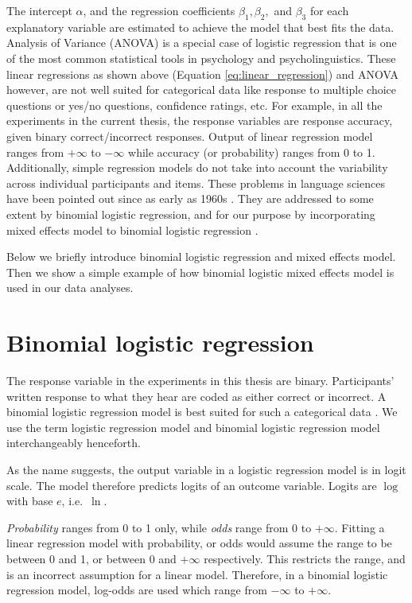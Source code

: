 \documentclass[a4paper, nobind]{templates/ociamthesis}
\begin{document}
The intercept \(\alpha\), and the regression coefficients \(\beta_1, \beta_2,\) and \(\beta_3\) for each explanatory variable are estimated to achieve the model that best fits the data.
Analysis of Variance (ANOVA) is a special case of logistic regression \autocite{Chatterjee2012,Vasishth2022} that is one of the most common statistical tools in psychology and psycholinguistics.
These linear regressions as shown above (Equation \ref{eq:linear_regression}) and ANOVA however, are not well suited for categorical data like response to multiple choice questions or yes/no questions, confidence ratings, etc.
For example, in all the experiments in the current thesis, the response variables are response accuracy, given binary correct/incorrect responses.
Output of linear regression model ranges from \(+\infty\) to \(-\infty\) while accuracy (or probability) ranges from 0 to 1.
Additionally, simple regression models do not take into account the variability across individual participants and items.
These problems in language sciences have been pointed out since as early as 1960s \autocite{Coleman1964,Clark1973}.
They are addressed to some extent by binomial logistic regression, and for our purpose by incorporating mixed effects model to binomial logistic regression \autocite{Baayen2008}.

Below we briefly introduce binomial logistic regression and mixed effects model.
Then we show a simple example of how binomial logistic mixed effects model is used in our data analyses.

\hypertarget{binomial-logistic-regression}{%
\section{Binomial logistic regression}\label{binomial-logistic-regression}}

The response variable in the experiments in this thesis are binary.
Participants' written response to what they hear are coded as either correct or incorrect.
A binomial logistic regression model is best suited for such a categorical data \autocite{Jaeger2008}.
We use the term logistic regression model and binomial logistic regression model interchangeably henceforth.

As the name suggests, the output variable in a logistic regression model is in logit scale.
The model therefore predicts logits of an outcome variable.
Logits are \(\log\) with base \(e\), i.e.~\(\ln\).

\emph{Probability} ranges from 0 to 1 only, while \emph{odds} range from 0 to \(+\infty\).
Fitting a linear regression model with probability, or odds would assume the range to be between 0 and 1, or between 0 and \(+\infty\) respectively.
This restricts the range, and is an incorrect assumption for a linear model.
Therefore, in a binomial logistic regression model, log-odds are used which range from \(-\infty\) to \(+\infty\).
\end{document}
